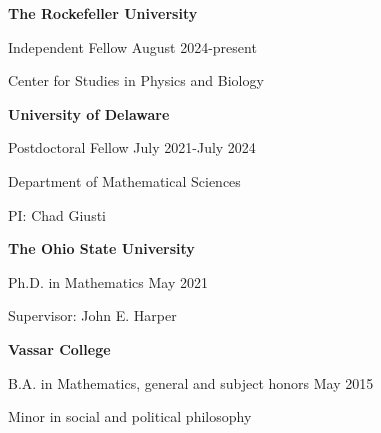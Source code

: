 \documentclass[10pt,letterpaper]{article}
\renewenvironment{itemize}{
  \begin{list}{}{
    \setlength{\leftmargin}{1.5em}
    \setlength{\itemsep}{0.25em}
    \setlength{\parskip}{0pt}
    \setlength{\parsep}{0.25em}
  }
}{
  \end{list}
}
\begin{document}
\begin{itemize}

\item {\bf The Rockefeller University}
\begin{itemize}
\item Independent Fellow \hfill August 2024-present

\vspace{-1ex}

\item Center for Studies in Physics and Biology
\end{itemize}





\item {\bf University of Delaware}
\begin{itemize}
\item Postdoctoral Fellow \hfill July 2021-July 2024

\vspace{-1ex}

\item Department of Mathematical Sciences

\vspace{-1ex}

\item PI: Chad Giusti
\end{itemize}

\item {\bf The Ohio State University}
	
	\begin{itemize}
	\item Ph.D. in Mathematics \hfill May 2021
	
	
	
	\vspace{-1ex}
		
	\item Supervisor: John E. Harper
	\end{itemize}

 
\item {\bf Vassar College}
  
  \begin{itemize}
	\item B.A. in Mathematics, general and subject honors \hfill May 2015
	
	\vspace{-1ex}
	
  	\item Minor in social and political philosophy 
  \end{itemize}

\end{itemize}
\end{document}
